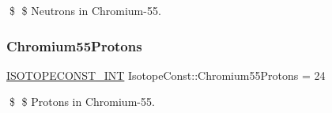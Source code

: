 \$ \$ Neutrons in Chromium-\/55. \mbox{\label{group___isotope_const-_chromium-_cr55_ga9d09817317084917d239b4b5f9388029}} 
\subsubsection{\texorpdfstring{Chromium55\+Protons}{Chromium55Protons}}
{\footnotesize\ttfamily \mbox{\hyperlink{group___isotope_const-_macros_ga5f18360b3e99483a35c32d789e62621c}{I\+S\+O\+T\+O\+P\+E\+C\+O\+N\+S\+T\+\_\+\+I\+NT}} Isotope\+Const\+::\+Chromium55\+Protons = 24}

\$ \$ Protons in Chromium-\/55. 